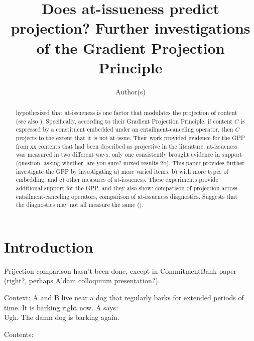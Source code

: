 \documentclass[11pt,fleqn]{article}
\title{Does at-issueness predict projection? Further investigations of the Gradient Projection Principle}
\author{Author(s)}
\newcommand{\6}{\mbox{$[\hspace*{-.6mm}[$}}
\newcommand{\9}{\mbox{$]\hspace*{-.6mm}]$}}
\begin{document}

\maketitle

\vspace*{-1cm}

\begin{abstract}

\citealt{tbd-variability} hypothesized that at-issueness is one factor that modulates the projection of content (see also \citealt{brst-salt10,brst-ar}). Specifically, according to their Gradient Projection Principle, if content $C$ is expressed by a constituent embedded under an entailment-canceling operator, then $C$ projects to the extent that it is not at-issue. Their work provided evidence for the GPP from xx contents that had been described as projective in the literature, at-issueness was measured in two different ways, only one consistently brought evidence in support (question, asking whether, are you sure? mixed results 2b). This paper provides further investigate the GPP by investigating a) more varied items, b) with more types of embedding, and c) other measures of at-issueness. These experiments provide additional support for the GPP, and they also show: comparison of projection across entailment-canceling operators, comparison of at-issueness diagnostics. Suggests that the diagnostics may not all measure the same (\citealt{snider2017}).

\end{abstract}

\newpage

\tableofcontents

\newpage
		
\section{Introduction}\label{s1}

Prijection comparison hasn't been done, except in CommitmentBank paper (right?, perhaps A'dam colloquium presentation?).

\begin{exe}
\ex Context: A and B live near a dog that regularly barks for extended periods of time. It is barking right now. A says:  \\ Ugh. The damn dog is barking again.
\end{exe}

Contents:
\end{document}
